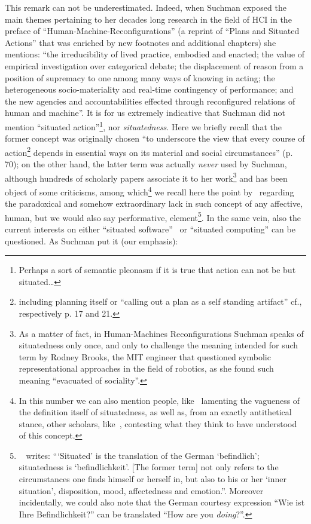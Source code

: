 \documentclass{article}
\begin{document}
This remark can not be underestimated. Indeed, when Suchman exposed the main themes pertaining to her decades long research in the field of HCI in the preface of ``Human-Machine-Reconfigurations'' (a reprint of ``Plans and Situated Actions'' that was enriched by new footnotes and additional chapters) she mentions: ``the irreducibility of lived practice, embodied and enacted; the value of empirical investigation over categorical debate; the displacement of reason from a position of supremacy to one among many ways of knowing in acting; the heterogeneous socio-materiality and real-time contingency of performance; and the new agencies and accountabilities effected through reconfigured relations of human and machine''\citep[xii]{suchman_human-machine_2006}. 
It is for us extremely indicative that Suchman did not mention ``situated action''\footnote{Perhaps a sort of semantic pleonasm if it is true that action can not be but situated\ldots}, nor \emph{situatedness}. Here we briefly recall that the former concept was originally chosen ``to underscore the view that every course of action\footnote{including planning itself or ``calling out a plan as a self standing artifact'' cf., respectively p. 17 and 21.} depends in essential ways on its material and social circumstances'' (p. 70); on the other hand, the latter term was actually \emph{never} used by Suchman, although hundreds of scholarly papers associate it to her work\footnote{As a matter of fact, in Human-Machines Reconfigurations Suchman speaks of situatedness only once, and only to challenge the meaning intended for such term by Rodney Brooks, the MIT engineer that questioned symbolic representational approaches in the field of robotics, as she found such meaning ``evacuated of sociality''.} and has been object of some criticisms, among which\footnote{In this number we can also mention people, like~\citet{lave_situated_1991} lamenting the vagueness of the definition itself of situatedness, as well as, from an exactly antithetical stance, other scholars, like~\citet{vera_situated_1993}, contesting what they think to have understood of this concept.} we recall here the point by~\citet{ciborra_mind_2006} regarding the paradoxical and somehow extraordinary lack in such concept of any affective, human, but we would also say performative, element\footnote{~\citet{ciborra_mind_2006} writes: ```Situated' is the translation of the German `befindlich'; situatedness is `befindlichkeit'. [The former term]  not only refers to the circumstances one finds himself or herself in, but also to his or her `inner situation', disposition, mood, affectedness and emotion.''. Moreover incidentally, we could also note that the German courtesy expression ``Wie ist Ihre Befindlichkeit?'' can be translated ``How are you \emph{doing}?''.}. In the same vein, also the current interests on either ``situated software''~\citep{balasubramaniam_situated_2008} or ``situated computing'' can be questioned. As Suchman put it (our emphasis):
\end{document}
